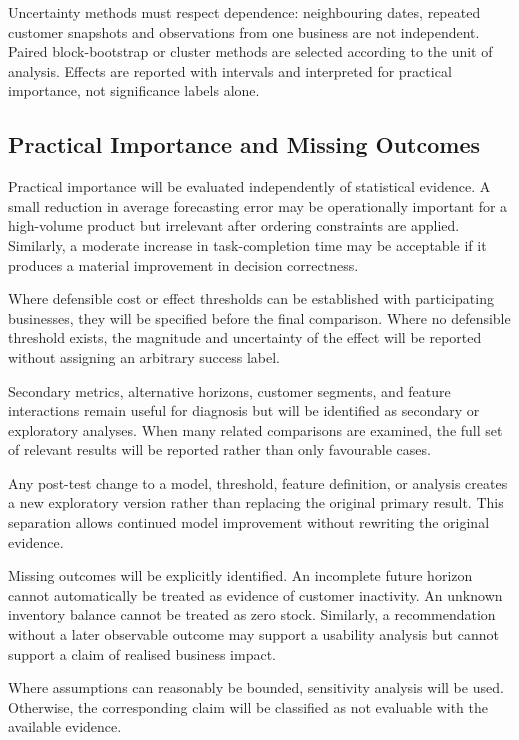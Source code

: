 \documentclass[a4paper,11pt,oneside]{book}
\theoremstyle{plain}
\theoremstyle{definition}
\theoremstyle{remark}
\begin{document}
Uncertainty methods must respect dependence: neighbouring dates, repeated
customer snapshots and observations from one business are not independent.
Paired block-bootstrap or cluster methods are selected according to the unit
of analysis. Effects are reported with intervals and interpreted for practical
importance, not significance labels alone.

\subsection{Practical Importance and Missing Outcomes}
\label{subsec:practical_importance}

Practical importance will be evaluated independently of statistical evidence.
A small reduction in average forecasting error may be operationally important
for a high-volume product but irrelevant after ordering constraints are applied.
Similarly, a moderate increase in task-completion time may be acceptable if it
produces a material improvement in decision correctness.

Where defensible cost or effect thresholds can be established with participating
businesses, they will be specified before the final comparison. Where no
defensible threshold exists, the magnitude and uncertainty of the effect will be
reported without assigning an arbitrary success label.

Secondary metrics, alternative horizons, customer segments, and feature
interactions remain useful for diagnosis but will be identified as secondary or
exploratory analyses. When many related comparisons are examined, the full set
of relevant results will be reported rather than only favourable cases.

Any post-test change to a model, threshold, feature definition, or analysis
creates a new exploratory version rather than replacing the original primary
result. This separation allows continued model improvement without rewriting
the original evidence.

Missing outcomes will be explicitly identified. An incomplete future horizon
cannot automatically be treated as evidence of customer inactivity. An unknown
inventory balance cannot be treated as zero stock. Similarly, a recommendation
without a later observable outcome may support a usability analysis but cannot
support a claim of realised business impact.

Where assumptions can reasonably be bounded, sensitivity analysis will be used.
Otherwise, the corresponding claim will be classified as not evaluable with the
available evidence.
\end{document}
